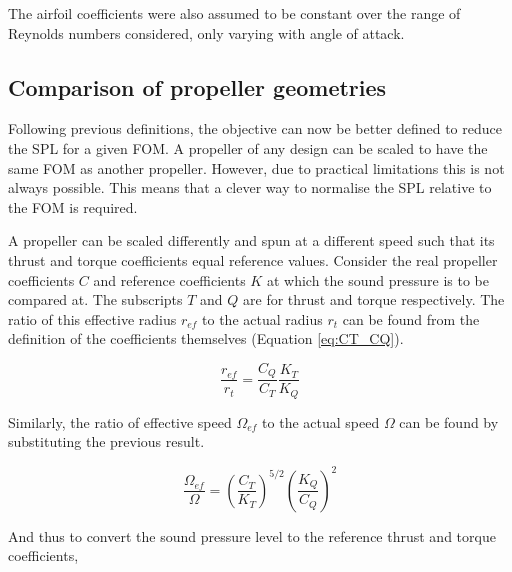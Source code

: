 \documentclass[12pt,a4paper]{article}
\begin{document}
The airfoil coefficients were also assumed to be constant over the range of Reynolds numbers considered, only varying with angle of attack.




\subsection{Comparison of propeller geometries}
Following previous definitions, the objective can now be better defined to reduce the SPL for a given FOM.
A propeller of any design can be scaled to have the same FOM as another propeller.
However, due to practical limitations this is not always possible. 
This means that a clever way to normalise the SPL relative to the FOM is required.

A propeller can be scaled differently and spun at a different speed such that its thrust and torque coefficients equal reference values.
Consider the real propeller coefficients $C$ and reference coefficients $K$ at which the sound pressure is to be compared at.
The subscripts $T$ and $Q$ are for thrust and torque respectively.
The ratio of this effective radius $r_{ef}$ to the actual radius $r_t$ can be found from the definition of the coefficients themselves (Equation \ref{eq:CT_CQ}).

\begin{equation}
    \frac{r_{ef}}{r_t} = \frac{C_Q}{C_T}\frac{K_T}{K_Q}
\end{equation}

Similarly, the ratio of effective speed $\Omega_{ef}$ to the actual speed $\Omega$ can be found by substituting the previous result.

\begin{equation}
    \frac{\Omega_{ef}}{\Omega} = \left(\frac{C_T}{K_T}\right)^{5/2} \left( \frac{K_Q}{C_Q} \right)^2
\end{equation}

And thus to convert the sound pressure level to the reference thrust and torque coefficients,
\end{document}
